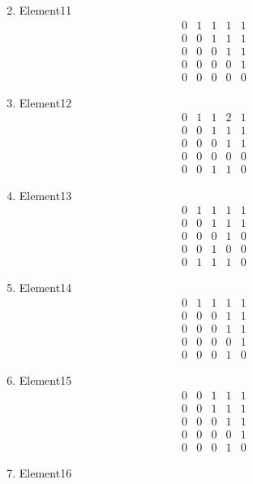 \documentclass[12pt]{article}
\begin{document}
\begin{multicols}{3}
\begin{enumerate}
\begin{equation*}
\end{equation*}
\item Element11
\begin{equation*}
\begin{array}{ccccc}
0&1&1&1&1\\
0&0&1&1&1\\
0&0&0&1&1\\
0&0&0&0&1\\
0&0&0&0&0
\end{array}
\end{equation*}
\item Element12
\begin{equation*}
\begin{array}{ccccc}
0&1&1&2&1\\
0&0&1&1&1\\
0&0&0&1&1\\
0&0&0&0&0\\
0&0&1&1&0
\end{array}
\end{equation*}
\item Element13
\begin{equation*}
\begin{array}{ccccc}
0&1&1&1&1\\
0&0&1&1&1\\
0&0&0&1&0\\
0&0&1&0&0\\
0&1&1&1&0
\end{array}
\end{equation*}
\item Element14
\begin{equation*}
\begin{array}{ccccc}
0&1&1&1&1\\
0&0&0&1&1\\
0&0&0&1&1\\
0&0&0&0&1\\
0&0&0&1&0
\end{array}
\end{equation*}
\item Element15
\begin{equation*}
\begin{array}{ccccc}
0&0&1&1&1\\
0&0&1&1&1\\
0&0&0&1&1\\
0&0&0&0&1\\
0&0&0&1&0
\end{array}
\end{equation*}
\item Element16

\end{enumerate}
\end{multicols}
\end{document}
